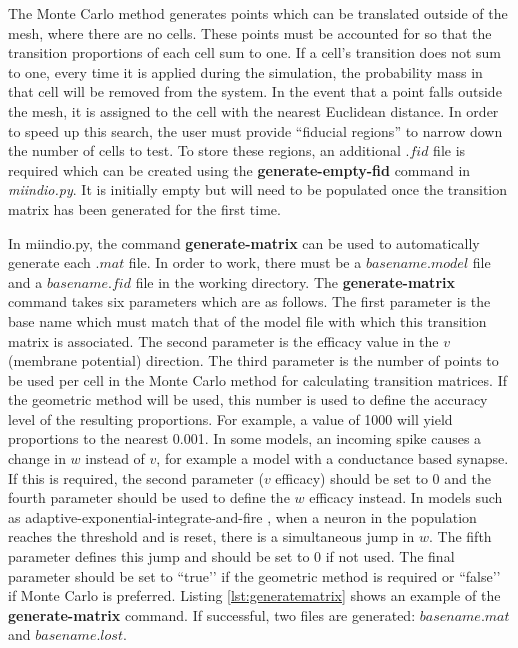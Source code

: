\documentclass[utf8]{frontiersSCNS} %
\begin{document}
The Monte Carlo method generates points which can be translated outside of the mesh, where there are no cells. These points must be accounted for so that the transition proportions of each cell sum to one. If a cell's transition does not sum to one, every time it is applied during the simulation, the probability mass in that cell will be removed from the system. In the event that a point falls outside the mesh, it is assigned to the cell with the nearest Euclidean distance. In order to speed up this search, the user must provide ``fiducial regions'' to narrow down the number of cells to test. To store these regions, an additional $.fid$ file is required which can be created using the \textbf{generate-empty-fid} command in \textit{miindio.py}. It is initially empty but will need to be populated once the transition matrix has been generated for the first time.

In miindio.py, the command \textbf{generate-matrix} can be used to automatically generate each $.mat$ file. In order to work, there must be a $basename.model$ file and a $basename.fid$ file in the working directory. The \textbf{generate-matrix} command takes six parameters which are as follows. The first parameter is the base name which must match that of the model file with which this transition matrix is associated. The second parameter is the efficacy value in the $v$ (membrane potential) direction. The third parameter is the number of points to be used per cell in the Monte Carlo method for calculating transition matrices. If the geometric method will be used, this number is used to define the accuracy level of the resulting proportions. For example, a value of 1000 will yield proportions to the nearest 0.001. In some models, an incoming spike causes a change in $w$ instead of $v$, for example a model with a conductance based synapse. If this is required, the second parameter ($v$ efficacy) should be set to 0 and the fourth parameter should be used to define the $w$ efficacy instead. In models such as adaptive-exponential-integrate-and-fire \citep{brette2005}, when a neuron in the population reaches the threshold and is reset, there is a simultaneous jump in $w$. The fifth parameter defines this jump and should be set to 0 if not used. The final parameter should be set to ``true’’ if the geometric method is required or ``false’’ if Monte Carlo is preferred. Listing \ref{lst:generatematrix} shows an example of the \textbf{generate-matrix} command. If successful, two files are generated: $basename.mat$ and $basename.lost$.
\end{document}
